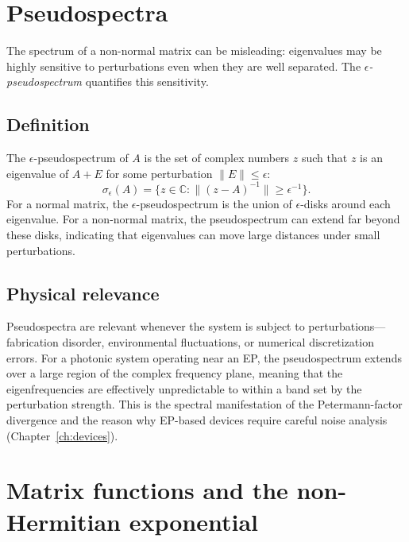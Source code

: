 \section{Pseudospectra}
\label{sec:pseudospectra}

The spectrum of a non-normal matrix can be misleading: eigenvalues may
be highly sensitive to perturbations even when they are well separated.
The \emph{$\epsilon$-pseudospectrum} quantifies this sensitivity.

\subsection{Definition}
\label{ssec:pseudospec-def}

The $\epsilon$-pseudospectrum of $A$ is the set of complex numbers
$z$ such that $z$ is an eigenvalue of $A + E$ for some perturbation
$\|E\| \le \epsilon$:
\begin{equation}
 \sigma_\epsilon(A) = \{z \in \mathbb{C} :
 \|(z - A)^{-1}\| \ge \epsilon^{-1}\}.
 \label{eq:pseudospectrum}
\end{equation}
For a normal matrix, the $\epsilon$-pseudospectrum is the union of
$\epsilon$-disks around each eigenvalue. For a non-normal matrix, the
pseudospectrum can extend far beyond these disks, indicating that
eigenvalues can move large distances under small perturbations.

\subsection{Physical relevance}
\label{ssec:pseudospec-physics}

Pseudospectra are relevant whenever the system is subject to
perturbations---fabrication disorder, environmental fluctuations,
or numerical discretization errors. For a photonic system operating
near an EP, the pseudospectrum extends over a large region of the
complex frequency plane, meaning that the eigenfrequencies are
effectively unpredictable to within a band set by the perturbation
strength. This is the spectral manifestation of the Petermann-factor
divergence and the reason why EP-based devices require careful
noise analysis (Chapter~\ref{ch:devices}).


\section{Matrix functions and the non-Hermitian exponential}
\label{sec:matrix-exp}

